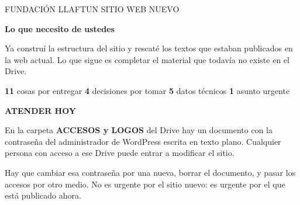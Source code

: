 \documentclass[11pt,a4paper]{article}
\begin{document}
\sffamily

{\footnotesize\color{bosqueclaro}FUNDACIÓN LLAFTUN \textperiodcentered{} SITIO WEB NUEVO}

\vspace{0.7em}

{\rmfamily\bfseries\color{tinta}\fontsize{30}{34}\selectfont Lo que necesito de ustedes\par}

\vspace{0.7em}

{\rmfamily\large\color{tintasuave}
Ya construí la estructura del sitio y rescaté los textos que estaban
publicados en la web actual. Lo que sigue es completar el material que
todavía no existe en el Drive.\par}

\vspace{1.2em}

\begin{tcolorbox}[
  colback=superficie, colframe=superficie,
  boxrule=0pt, arc=2pt, left=10pt, right=10pt, top=8pt, bottom=8pt
]
\small\color{tintasuave}
\textbf{\color{tinta}11} cosas por entregar \hfill
\textbf{\color{tinta}4} decisiones por tomar \hfill
\textbf{\color{tinta}5} datos técnicos \hfill
\textbf{\color{tinta}1} asunto urgente
\end{tcolorbox}

\vspace{0.8em}

\begin{tcolorbox}[
  colback=gredasuave, colframe=greda,
  boxrule=0pt, leftrule=2.5pt, arc=0pt,
  left=12pt, right=12pt, top=10pt, bottom=10pt
]
{\footnotesize\bfseries\color{greda}ATENDER HOY}

\vspace{0.4em}
\small
En la carpeta \textbf{ACCESOS y LOGOS} del Drive hay un documento con la
contraseña del administrador de WordPress escrita en texto plano. Cualquier
persona con acceso a ese Drive puede entrar a modificar el sitio.

\vspace{0.5em}
Hay que cambiar esa contraseña por una nueva, borrar el documento, y pasar
los accesos por otro medio. No es urgente por el sitio nuevo: es urgente por
el que está publicado ahora.
\end{tcolorbox}
\end{document}
